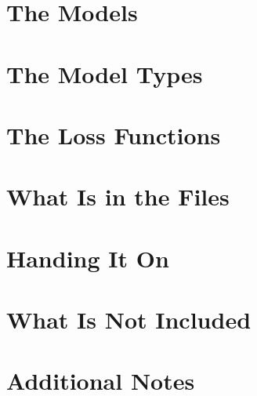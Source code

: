 \documentclass[11pt,a4paper]{article}
\begin{document}
\section{The Models}


\section{The Model Types}


\section{The Loss Functions}\label{sec:losses}


\section{What Is in the Files}


\section{Handing It On}\label{sec:handover}


\section{What Is Not Included}


\section{Additional Notes}\label{sec:additional}


% 
% 
\end{document}
